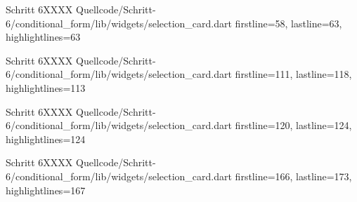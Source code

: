 \begin{alexlisting}{Schritt 6}{XXXX}
    {Quellcode/Schritt-6/conditional_form/lib/widgets/selection_card.dart}
    {firstline=58, lastline=63, highlightlines={63}}
    \label{lst:Schritt6XXXX}
\end{alexlisting}

\begin{alexlisting}{Schritt 6}{XXXX}
    {Quellcode/Schritt-6/conditional_form/lib/widgets/selection_card.dart}
    {firstline=111, lastline=118, highlightlines={113}}
    \label{lst:Schritt6XXXX}
\end{alexlisting}

\begin{alexlisting}{Schritt 6}{XXXX}
    {Quellcode/Schritt-6/conditional_form/lib/widgets/selection_card.dart}
    {firstline=120, lastline=124, highlightlines={124}}
    \label{lst:Schritt6XXXX}
\end{alexlisting}

\begin{alexlisting}{Schritt 6}{XXXX}
    {Quellcode/Schritt-6/conditional_form/lib/widgets/selection_card.dart}
    {firstline=166, lastline=173, highlightlines={167}}
    \label{lst:Schritt6XXXX}
\end{alexlisting}

\ifincludeall \clearpage \fi 
